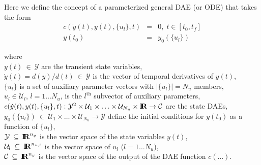 \documentclass[pdf,ps2pdf,11pt]{SANDreport}
\begin{document}
Here we define the concept of a parameterized general DAE (or ODE) that takes
the form
%
\begin{eqnarray}
c\left( \dot{y}(t), y(t), \{u_l\}, t \right) & = & 0,
\; t \in \left[ t_0, t_f \right] \label{rythmos:eqn:gen:c} \\
y(t_0) & = & y_0(\{u_l\}) \label{rythmos:eqn:gen:c:ic}
\end{eqnarray}
\begin{tabbing}
\hspace{4ex}where\hspace{1ex}\= \\
\>	$y(t) \:\in\:\mathcal{Y}$ are the transient state variables, \\
\>	$\dot{y}(t) = d(y)/d(t)\:\in\:\mathcal{Y}$ is the vector of temporal derivatives of $y(t)$, \\
\>	$\{u_l\}$ is a set of auxiliary parameter vectors with $|\{u_l\}| = N_u$ members, \\
\>	$u_l\in\mathcal{U}_l$, $l=1 {}\ldots N_u$, is the $l^{\mbox{th}}$ subvector of auxiliary parameters, \\
\>	$c(\dot{y}(t), y(t), \{u_l\}, t) :
		\mathcal{Y}^2 \times \mathcal{U}_1 \times \ldots \times \mathcal{U}_{N_u} \times \mbox{\textbf{I}}\hspace{-0.6ex}\mbox{\textbf{R}}
		\rightarrow \mathcal{C}$ are the state DAEs, \\
\>	$y_0(\{u_l\}) \:\in\:\mathcal{U}_1 \times \ldots \times \mathcal{U}_{N_u} \rightarrow \mathcal{Y}$
		define the initial conditions for $y(t_0)$ as a function of $\{u_l\}$, \\
\>	$\mathcal{Y} \:\subseteq\:\mbox{\textbf{I}}\hspace{-0.6ex}\mbox{\textbf{R}}^{n_y}$ is the vector space of the state variables $y(t)$, \\
\>	$\mathcal{U}_l \:\subseteq\:\mbox{\textbf{I}}\hspace{-0.6ex}\mbox{\textbf{R}}^{n_{u,l}}$ is the vector space of $u_l$ ($l = 1 {}\ldots N_u$), \\
\>	$\mathcal{C} \:\subseteq\:\mbox{\textbf{I}}\hspace{-0.6ex}\mbox{\textbf{R}}^{n_y}$ is the vector space of the output of the DAE function $c(\ldots)$.
\end{tabbing}
\end{document}
